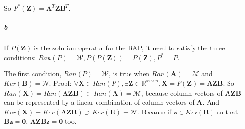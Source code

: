 \documentclass[22pt]{article}
\begin{document}
		So $P^*(\mathbf{Z}) = \mathbf{A}^T\mathbf{Z}\mathbf{B}^T$.

		\subparagraph{b}If $P(\mathbf{Z})$ is the solution operator for the BAP, it need to satisfy the three conditions: $Ran(P) =\mathcal{W}, P(P(\mathbf{Z})) = P(\mathbf{Z}), P^* = P$.

		The first condition, $Ran(P) =\mathcal{W}$, is true when $Ran(\mathbf{A}) = \mathcal{M}$ and $Ker(\mathbf{B}) = \mathcal{N}$. Proof: $\forall \mathbf{X} \in Ran(P), \exists \mathbf{Z} \in \mathbb{R}^{m\times n}, \mathbf{X} = P(\mathbf{Z}) = \mathbf{AZB}$. So $Ran(\mathbf{X}) = Ran(\mathbf{AZB}) \subset Ran(\mathbf{A}) = \mathcal{M}$, because column vectors of $\mathbf{AZB}$ can be represented by a linear combination of column vectors of $\mathbf{A}$. And $Ker(\mathbf{X}) = Ker(\mathbf{AZB}) \supset Ker(\mathbf{B}) = \mathcal{N}$. Because if $\mathbf{z} \in Ker(\mathbf{B})$ so that $\mathbf{Bz} = \mathbf{0}$, $\mathbf{AZBz = 0}$ too.
\end{document}
